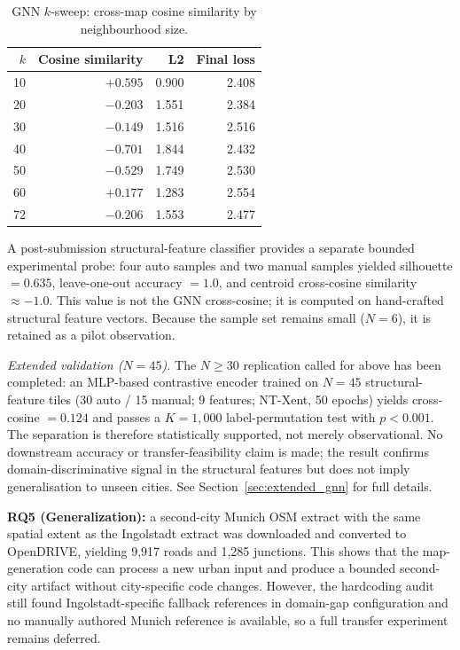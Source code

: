 \begin{table}[htbp]
\centering
\small
\begin{tabular}{rrrr}
\toprule
$k$ & Cosine similarity & L2 & Final loss \\
\midrule
10 & $+0.595$ & 0.900 & 2.408 \\
20 & $-0.203$ & 1.551 & 2.384 \\
30 & $-0.149$ & 1.516 & 2.516 \\
40 & $-0.701$ & 1.844 & 2.432 \\
50 & $-0.529$ & 1.749 & 2.530 \\
60 & $+0.177$ & 1.283 & 2.554 \\
72 & $-0.206$ & 1.553 & 2.477 \\
\bottomrule
\end{tabular}
\caption{GNN $k$-sweep: cross-map cosine similarity by neighbourhood size.}
\label{tab:gnn_ksweep}
\end{table}

A post-submission structural-feature classifier provides a separate bounded experimental probe: four auto samples and two manual samples yielded silhouette $=0.635$, leave-one-out accuracy $=1.0$, and centroid cross-cosine similarity $\approx -1.0$. This value is not the GNN cross-cosine; it is computed on hand-crafted structural feature vectors. Because the sample set remains small ($N=6$), it is retained as a pilot observation.

\noindent\textit{Extended validation ($N=45$).} The $N \geq 30$ replication called for above has been completed: an MLP-based contrastive encoder trained on $N=45$ structural-feature tiles (30 auto / 15 manual; 9 features; NT-Xent, 50 epochs) yields cross-cosine $=0.124$ and passes a $K=1{,}000$ label-permutation test with $p<0.001$. The separation is therefore statistically supported, not merely observational. No downstream accuracy or transfer-feasibility claim is made; the result confirms domain-discriminative signal in the structural features but does not imply generalisation to unseen cities. See Section~\ref{sec:extended_gnn} for full details.

\textbf{RQ5 (Generalization):} a second-city Munich OSM extract with the same spatial extent as the Ingolstadt extract was downloaded and converted to OpenDRIVE, yielding 9,917 roads and 1,285 junctions. This shows that the map-generation code can process a new urban input and produce a bounded second-city artifact without city-specific code changes. However, the hardcoding audit still found Ingolstadt-specific fallback references in domain-gap configuration and no manually authored Munich reference is available, so a full transfer experiment remains deferred.

